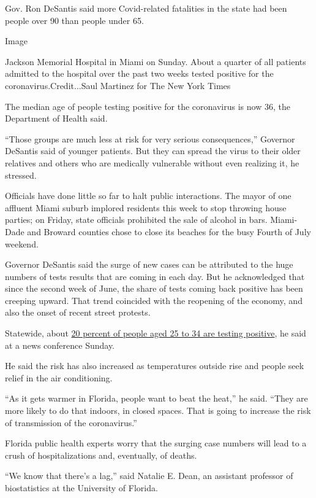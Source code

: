 Gov. Ron DeSantis said more Covid-related fatalities in the state had
been people over 90 than people under 65.

Image

Jackson Memorial Hospital in Miami on Sunday. About a quarter of all
patients admitted to the hospital over the past two weeks tested
positive for the coronavirus.Credit...Saul Martinez for The New York
Times

The median age of people testing positive for the coronavirus is now 36,
the Department of Health said.

``Those groups are much less at risk for very serious consequences,''
Governor DeSantis said of younger patients. But they can spread the
virus to their older relatives and others who are medically vulnerable
without even realizing it, he stressed.

Officials have done little so far to halt public interactions. The mayor
of one affluent Miami suburb implored residents this week to stop
throwing house parties; on Friday, state officials prohibited the sale
of alcohol in bars. Miami-Dade and Broward counties chose to close its
beaches for the busy Fourth of July weekend.

Governor DeSantis said the surge of new cases can be attributed to the
huge numbers of tests results that are coming in each day. But he
acknowledged that since the second week of June, the share of tests
coming back positive has been creeping upward. That trend coincided with
the reopening of the economy, and also the onset of recent street
protests.

Statewide, about
\href{https://www.nytimes3xbfgragh.onion/2020/06/25/us/coronavirus-cases-young-people.html}{20
percent of people aged 25 to 34 are testing positive}, he said at a news
conference Sunday.

He said the risk has also increased as temperatures outside rise and
people seek relief in the air conditioning.

``As it gets warmer in Florida, people want to beat the heat,'' he said.
``They are more likely to do that indoors, in closed spaces. That is
going to increase the risk of transmission of the coronavirus.''

Florida public health experts worry that the surging case numbers will
lead to a crush of hospitalizations and, eventually, of deaths.

``We know that there's a lag,'' said Natalie E. Dean, an assistant
professor of biostatistics at the University of Florida.

